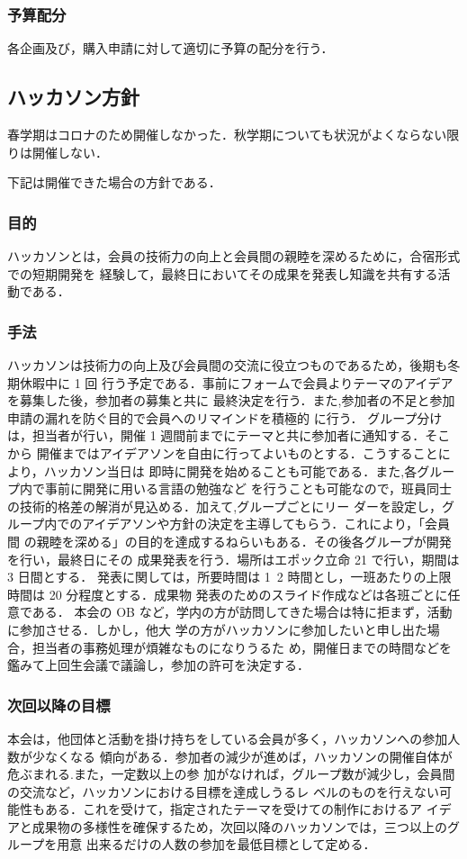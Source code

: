 \subsubsection*{予算配分}
各企画及び，購入申請に対して適切に予算の配分を行う．


\subsection*{ハッカソン方針}
春学期はコロナのため開催しなかった．秋学期についても状況がよくならない限りは開催しない．

下記は開催できた場合の方針である．

\subsubsection*{目的}
ハッカソンとは，会員の技術力の向上と会員間の親睦を深めるために，合宿形式での短期開発を
経験して，最終日においてその成果を発表し知識を共有する活動である．

\subsubsection*{手法}
ハッカソンは技術力の向上及び会員間の交流に役立つものであるため，後期も冬期休暇中に 1 回
行う予定である．事前にフォームで会員よりテーマのアイデアを募集した後，参加者の募集と共に
最終決定を行う．また,参加者の不足と参加申請の漏れを防ぐ目的で会員へのリマインドを積極的
に行う．
グループ分けは，担当者が行い，開催 1 週間前までにテーマと共に参加者に通知する．そこから
開催まではアイデアソンを自由に行ってよいものとする．こうすることにより，ハッカソン当日は
即時に開発を始めることも可能である．また,各グループ内で事前に開発に用いる言語の勉強など
を行うことも可能なので，班員同士の技術的格差の解消が見込める．加えて,グループごとにリー
ダーを設定し，グループ内でのアイデアソンや方針の決定を主導してもらう．これにより，「会員間
の親睦を深める」の目的を達成するねらいもある．その後各グループが開発を行い，最終日にその
成果発表を行う．場所はエポック立命 21 で行い，期間は 3 日間とする．
発表に関しては，所要時間は 1~2 時間とし，一班あたりの上限時間は 20 分程度とする．成果物
発表のためのスライド作成などは各班ごとに任意である．
本会の OB など，学内の方が訪問してきた場合は特に拒まず，活動に参加させる．しかし，他大
学の方がハッカソンに参加したいと申し出た場合，担当者の事務処理が煩雑なものになりうるた
め，開催日までの時間などを鑑みて上回生会議で議論し，参加の許可を決定する．


\subsubsection*{次回以降の目標}
本会は，他団体と活動を掛け持ちをしている会員が多く，ハッカソンへの参加人数が少なくなる
傾向がある．参加者の減少が進めば，ハッカソンの開催自体が危ぶまれる.また，一定数以上の参
加がなければ，グループ数が減少し，会員間の交流など，ハッカソンにおける目標を達成しうるレ
ベルのものを行えない可能性もある．これを受けて，指定されたテーマを受けての制作におけるア
イデアと成果物の多様性を確保するため，次回以降のハッカソンでは，三つ以上のグループを用意
出来るだけの人数の参加を最低目標として定める．



